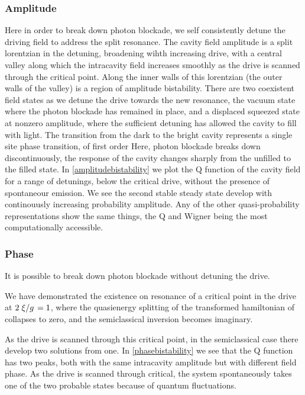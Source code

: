 \subsubsection{Amplitude}
Here in order to break down photon blockade, we self consistently detune the driving field to address the split resonance. 
The cavity field amplitude is a split lorentzian in the detuning, broadening wihth increasing drive, with a central valley along which the intracavity field increases smoothly as the drive is scanned through the critical point.
Along the inner walls of this lorentzian (the outer walls of the valley) is a region of amplitude bistability. 
There are two coexistent field states as we detune the drive towards the new resonance, the vacuum state where the photon blockade has remained in place, and a displaced squeezed state at nonzero amplitude, where the sufficient detuning has allowed the cavity to fill with light. 
The transition from the dark to the bright cavity represents a single site phase transition, of first order \cite{Carmichael2015}
Here, photon blockade breaks down discontinuously, the response of the cavity changes sharply from the unfilled to the filled state. 
In \cref{amplitudebistability} we plot the Q function of the cavity field for a range of detunings, below the critical drive, without the presence of spontaneour emission.
We see the second stable steady state develop with continouusly increasing probability amplitude. 
Any of the other quasi-probability representations show the same things, the Q and Wigner being the most computationally accessible. 
\subsubsection{Phase}
It is possible to break down photon blockade without detuning the drive.

We have demonstrated \cite{Carmichael2015} the existence on resonance of a critical point in the drive at $2\flatfrac{\xi}{g}=1$, where the quasienergy splitting of the transformed hamiltonian of \cite{Alsing1992} collapses to zero, and the semiclassical inversion becomes imaginary. 

As the drive is scanned through this critical point, in the semiclassical case there develop two solutions from one.
In \cref{phasebistability} we see that the Q function has two peaks, both with the same intracavity amplitude but with different field phase. 
As the drive is scanned through critical, the system spontaneously takes one of the two probable states because of quantum fluctuations. 

